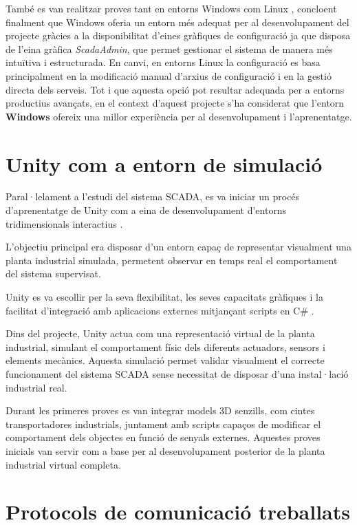 \documentclass[12pt,a4paper]{report}
\begin{document}
També es van realitzar proves tant en entorns Windows com Linux \cite{rapidscada_windows_install,rapidscada_linux_install}, concloent finalment que Windows oferia un entorn més adequat per al desenvolupament del projecte gràcies a la disponibilitat d'eines gràfiques de configuració ja que disposa de l'eina gràfica 	\textit{ScadaAdmin}, que permet gestionar el sistema de manera més intuïtiva i estructurada. En canvi, en entorns Linux la configuració es basa principalment en la modificació manual d'arxius de configuració i en la gestió directa dels serveis. Tot i que aquesta opció pot resultar adequada per a entorns productius avançats, en el context d'aquest projecte s'ha considerat que l'entorn \textbf{Windows} ofereix una millor experiència per al desenvolupament i l'aprenentatge.


\section{Unity com a entorn de simulació}
\label{sec:unity_research}

Paral·lelament a l'estudi del sistema SCADA, es va iniciar un procés d'aprenentatge de Unity com a eina de desenvolupament d'entorns tridimensionals interactius \cite{Unity,UnityOfficial}.

L'objectiu principal era disposar d'un entorn capaç de representar visualment una planta industrial simulada, permetent observar en temps real el comportament del sistema supervisat.

Unity es va escollir per la seva flexibilitat, les seves capacitats gràfiques i la facilitat d'integració amb aplicacions externes mitjançant scripts en C\# \cite{UnityProgrammingGuide}.

Dins del projecte, Unity actua com una representació virtual de la planta industrial, simulant el comportament físic dels diferents actuadors, sensors i elements mecànics. Aquesta simulació permet validar visualment el correcte funcionament del sistema SCADA sense necessitat de disposar d'una instal·lació industrial real.

Durant les primeres proves es van integrar models 3D senzills, com cintes transportadores industrials, juntament amb scripts capaços de modificar el comportament dels objectes en funció de senyals externes. Aquestes proves inicials van servir com a base per al desenvolupament posterior de la planta industrial virtual completa.

\section{Protocols de comunicació treballats}
\end{document}
